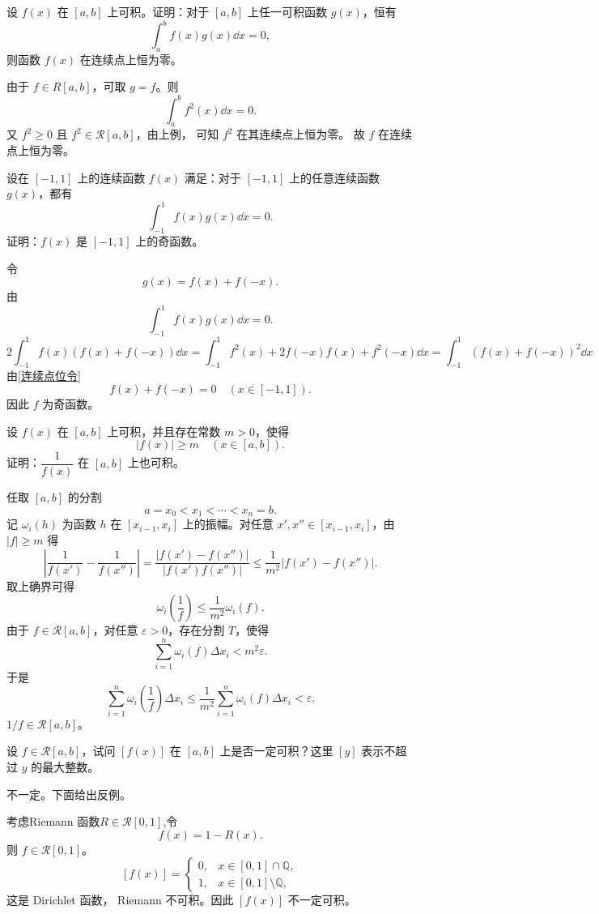 \begin{example}
	设 $f(x)$ 在 $[a,b]$ 上可积。证明：对于 $[a,b]$ 上任一可积函数 $g(x)$，恒有
	\[
	\int_a^b f(x)g(x)\dd x=0,
	\]
	则函数 $f(x)$ 在连续点上恒为零。
\end{example}
\begin{solution}
	由于 $f\in R[a,b]$，可取 $g=f$。则
	\[
	\int_a^b f^2(x)\dd x=0.
	\]
	又 $f^2\geq0$ 且 $f^2\in \mathcal{R}[a,b]$，由上例， 可知 $f^2$ 在其连续点上恒为零。
	故 $f$ 在连续点上恒为零。
\end{solution}
\begin{example}
	设在 $[-1,1]$ 上的连续函数 $f(x)$ 满足：对于 $[-1,1]$ 上的任意连续函数 $g(x)$，都有
	\[
	\int_{-1}^{1}f(x)g(x)\dd x=0.
	\]
	证明：$f(x)$ 是 $[-1,1]$ 上的奇函数。
\end{example}

\begin{solution}
	令
	\[
	g(x)=f(x)+f(-x).
	\]
	由
	\[
	\int_{-1}^{1}f(x)g(x)\dd x=0.
	\]
	\[2\int_{-1}^{1}f(x)(f(x)+f(-x))\dd x=\int_{-1}^{1}f^2(x)+2f(-x)f(x)+ f^2(-x)\dd x = \int_{-1}^1 (f(x)+ f(-x))^2 \dd x\]
	由\ref{连续点位令}
	\[
	f(x)+f(-x)=0\quad (x\in[-1,1]).
	\]
	因此 $f$ 为奇函数。
\end{solution}


\begin{problem}
	设 $f(x)$ 在 $[a,b]$ 上可积，并且存在常数 $m>0$，使得
	\[
	|f(x)|\geq m\quad (x\in[a,b]).
	\]
	证明：$\dfrac1{f(x)}$ 在 $[a,b]$ 上也可积。
\end{problem}

\begin{solution}
	任取 $[a,b]$ 的分割
	\[
	a=x_0<x_1<\cdots<x_n=b.
	\]
	记 $\omega_i(h)$ 为函数 $h$ 在 $[x_{i-1},x_i]$ 上的振幅。对任意 $x',x''\in[x_{i-1},x_i]$，由 $|f|\geq m$ 得
	\[
	\left|\frac1{f(x')}-\frac1{f(x'')}\right|
	=\frac{|f(x')-f(x'')|}{|f(x')f(x'')|}
	\leq \frac1{m^2}|f(x')-f(x'')|.
	\]
	取上确界可得
	\[
	\omega_i\left(\frac1f\right)\leq \frac1{m^2}\omega_i(f).
	\]
	由于 $f\in \mathcal{R}[a,b]$，对任意 $\varepsilon>0$，存在分割 $T$，使得
	\[
	\sum_{i=1}^n\omega_i(f)\Delta x_i<m^2\varepsilon.
	\]
	于是
	\[
	\sum_{i=1}^n\omega_i\left(\frac1f\right)\Delta x_i
	\leq \frac1{m^2}
	\sum_{i=1}^n\omega_i(f)\Delta x_i
	<\varepsilon.
	\]
	$1/f\in \mathcal{R}[a,b]$。
\end{solution}




\begin{problem}
	设 $f\in \mathcal{R}[a,b]$，试问 $[f(x)]$ 在 $[a,b]$ 上是否一定可积？这里 $[y]$ 表示不超过 $y$ 的最大整数。
\end{problem}

\begin{solution}
	不一定。下面给出反例。
	
考虑Riemann 函数$R\in \mathcal{R}[0,1]$,令
	\[
	f(x)=1-R(x).
	\]
	则 $f\in \mathcal{R}[0,1]$。
	\[
	[f(x)]=
	\begin{cases}
		0,&x\in[0,1]\cap\mathbb{Q},\\
		1,&x\in[0,1]\setminus\mathbb{Q},
	\end{cases}
	\]
	这是 Dirichlet 函数， Riemann 不可积。因此 $[f(x)]$ 不一定可积。
\end{solution}
